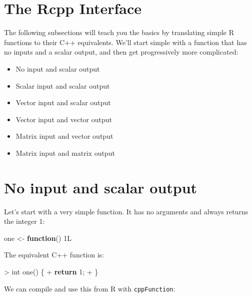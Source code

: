 \documentclass[
]{krantz}
\makeatletter
\newenvironment{Shaded}{\begin{snugshade}}{\end{snugshade}}
\newcommand{\ControlFlowTok}[1]{\textcolor[rgb]{0.27,0.27,0.27}{\textbf{#1}}}
\newcommand{\DataTypeTok}[1]{\textcolor[rgb]{0.27,0.27,0.27}{#1}}
\newcommand{\DecValTok}[1]{\textcolor[rgb]{0.06,0.06,0.06}{#1}}
\newcommand{\NormalTok}[1]{#1}
\newcommand{\StringTok}[1]{\textcolor[rgb]{0.5,0.5,0.5}{#1}}
\providecommand{\tightlist}{%
  \setlength{\itemsep}{0pt}\setlength{\parskip}{0pt}}
\newenvironment{kframe}{%
\medskip{}
\setlength{\fboxsep}{.8em}
 \def\at@end@of@kframe{}%
 \ifinner\ifhmode%
  \def\at@end@of@kframe{\end{minipage}}%
  \begin{minipage}{\columnwidth}%
 \fi\fi%
 \def\FrameCommand##1{\hskip\@totalleftmargin \hskip-\fboxsep
 \colorbox{shadecolor}{##1}\hskip-\fboxsep
     \hskip-\linewidth \hskip-\@totalleftmargin \hskip\columnwidth}%
 \MakeFramed {\advance\hsize-\width
   \@totalleftmargin\z@ \linewidth\hsize
   \@setminipage}}%
 {\par\unskip\endMakeFramed%
 \at@end@of@kframe}
\renewenvironment{Shaded}{\begin{kframe}}{\end{kframe}}
\makeatother
\begin{document}
\hypertarget{the-rcpp-interface}{%
\section{The Rcpp Interface}\label{the-rcpp-interface}}

The following subsections will teach you the basics by translating simple R functions to their C++ equivalents. We'll start simple with a function that has no inputs and a scalar output, and then get progressively more complicated:

\begin{itemize}
\tightlist
\item
  No input and scalar output
\item
  Scalar input and scalar output
\item
  Vector input and scalar output
\item
  Vector input and vector output
\item
  Matrix input and vector output
\item
  Matrix input and matrix output
\end{itemize}

\hypertarget{no-input-and-scalar-output}{%
\section{No input and scalar output}\label{no-input-and-scalar-output}}

Let's start with a very simple function. It has no arguments and always returns the integer 1:

\begin{Shaded}
\begin{Highlighting}[]
\NormalTok{one \textless{}{-}}\StringTok{ }\ControlFlowTok{function}\NormalTok{() 1L}
\end{Highlighting}
\end{Shaded}

The equivalent C++ function is:

\begin{Shaded}
\begin{Highlighting}[]
\NormalTok{\textgreater{} }\DataTypeTok{int}\NormalTok{ one() \{}
\NormalTok{+   }\ControlFlowTok{return} \DecValTok{1}\NormalTok{;}
\NormalTok{+ \}}
\end{Highlighting}
\end{Shaded}

We can compile and use this from R with \texttt{cppFunction}:
\end{document}
